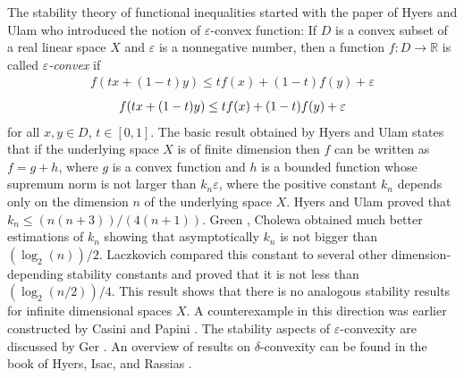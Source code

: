 \documentclass[12pt,leqno]{amsart}
\theoremstyle{definition}
\begin{document}
The stability theory of functional inequalities started with the paper
\cite{HyeUla52} of Hyers and Ulam who introduced the notion of ${\varepsilon}$-convex
function: If $D$ is a convex subset of a real linear space $X$ and
${\varepsilon}$ is a nonnegative number, then a function $f:D\to{\mathbb{R}}$ is called
{\it ${\varepsilon}$-convex} if
{
  {\begin{equation*}\begin{aligned}{
  f(tx+(1-t)y)\le tf(x)+(1-t)f(y) + {\varepsilon}
}\end{aligned}\end{equation*}}
  {\begin{equation}\begin{aligned}\label{E{0}}{
  f(tx+(1-t)y)\le tf(x)+(1-t)f(y) + {\varepsilon}
}\end{aligned}\end{equation}}}
for all $x,y\in D$, $t\in[0,1]$.  The basic result obtained by Hyers and
Ulam states that if the underlying space $X$ is of finite dimension then
$f$ can be written as $f=g+h$, where $g$ is a convex function and $h$ is
a bounded function whose supremum norm is not larger than $k_n{\varepsilon}$,
where the positive constant $k_n$ depends only on the dimension $n$ of
the underlying space $X$.  Hyers and Ulam proved that
$k_n\le(n(n+3))/(4(n+1))$. Green \cite{Gre52}, Cholewa \cite{Cho84a}
obtained much better estimations of $k_n$ showing that asymptotically
$k_n$ is not bigger than $(\log_2(n))/2$. Laczkovich \cite{Lac99}
compared this constant to several other dimension-depending stability
constants and proved that it is not less than $(\log_2(n/2))/4$. This
result shows that there is no analogous stability results for infinite dimensional
spaces $X$. A counterexample in this direction was earlier constructed
by Casini and Papini \cite{CasPap93}. The stability aspects of
${\varepsilon}$-convexity are discussed by Ger \cite{Ger94e}. An overview of results on
$\delta$-convexity can be found in the book of Hyers, Isac, and
Rassias \cite{HyeIsaRas98a}.
\end{document}
